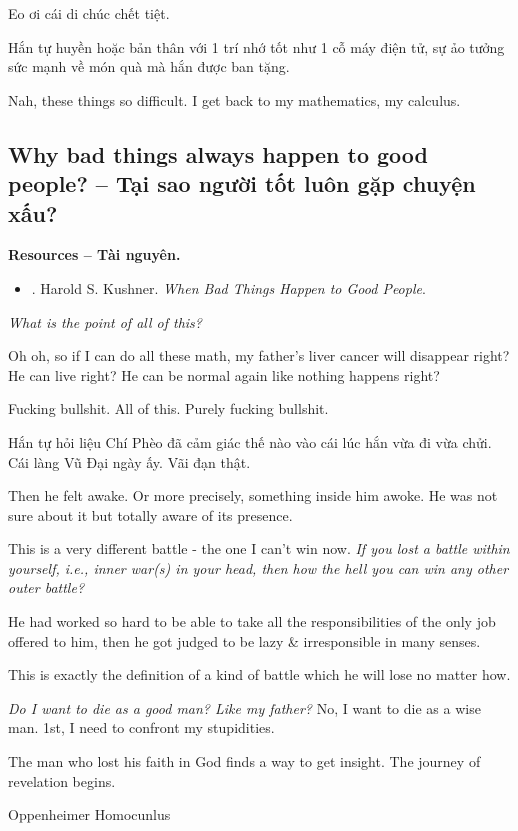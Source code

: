 \documentclass[12pt]{article}
\begin{document}
Eo ơi cái di chúc chết tiệt.

Hắn tự huyền hoặc bản thân với 1 trí nhớ tốt như 1 cỗ máy điện tử, sự ảo tưởng sức mạnh về món quà mà hắn được ban tặng.

Nah, these things so difficult. I get back to my mathematics, my calculus.

\subsection{Why bad things always happen to good people? -- Tại sao người tốt luôn gặp chuyện xấu?}
\textbf{\textsf{Resources -- Tài nguyên.}}
\begin{itemize}
	\item \cite{Kushner_bad_things_good_people}. {\sc Harold S. Kushner}. {\it When Bad Things Happen to Good People}.
\end{itemize}

{\it What is the point of all of this?}

Oh oh, so if I can do all these math, my father's liver cancer will disappear right? He can live right? He can be normal again like nothing happens right?

Fucking bullshit. All of this. Purely fucking bullshit.

Hắn tự hỏi liệu Chí Phèo đã cảm giác thế nào vào cái lúc hắn vừa đi vừa chửi. Cái làng Vũ Đại ngày ấy. Vãi đạn thật.


Then he felt awake. Or more precisely, something inside him awoke. He was not sure about it but totally aware of its presence.

This is a very different battle - the one I can't win now. {\it If you lost a battle within yourself, i.e., inner war(s) in your head, then how the hell you can win any other outer battle?}

He had worked so hard to be able to take all the responsibilities of the only job offered to him, then he got judged to be lazy \& irresponsible in many senses.



This is exactly the definition of a kind of battle which he will lose no matter how.

{\it Do I want to die as a good man? Like my father?} No, I want to die as a wise man. 1st, I need to confront my stupidities.

The man who lost his faith in God finds a way to get insight. The journey of revelation begins.

Oppenheimer Homocunlus
\end{document}
